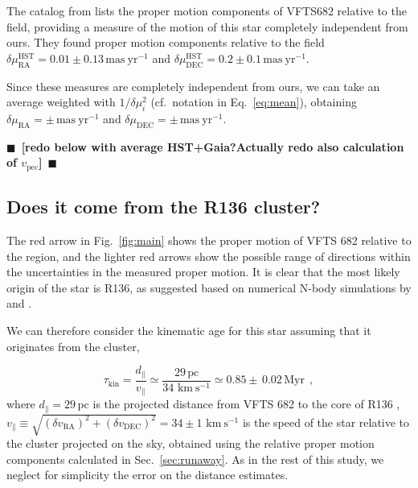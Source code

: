 \documentclass[apjl,twocolumn]{emulateapj}
\newcommand{\todo}[1]{{\large $\blacksquare$~\textbf{\color{red}[#1]}}~$\blacksquare$}
\newcommand{\kms}{{\,\mathrm{km\ s^{-1}}}}
\DeclareRobustCommand{\Eqref}[1]{Eq.~\ref{#1}}
\DeclareRobustCommand{\Figref}[1]{Fig.~\ref{#1}}
\DeclareRobustCommand{\Secref}[1]{Sec.~\ref{#1}}
\begin{document}
The catalog from \citet{platais:18} lists the proper motion
components of VFTS682 relative to the field, providing a
measure of the motion of this star completely independent from
ours. They found proper
motion components relative to the field
$\delta\mu_\mathrm{RA}^\mathrm{HST} = 0.01\pm0.13\,\mathrm{mas\
  yr^{-1}}$ and
$\delta\mu_\mathrm{DEC}^\mathrm{HST}=0.2\pm0.1\,\mathrm{mas\
  yr^{-1}}$.

Since these measures are completely independent from ours, we can take
an average weighted with $1/\delta \mu_i^2$ (cf.~notation in
\Eqref{eq:mean}), obtaining $\delta\mu_\mathrm{RA}=\pm\,\mathrm{mas\
  yr^{-1}}$ and $\delta\mu_\mathrm{DEC}=\pm\,\mathrm{mas\
  yr^{-1}}$.





\todo{redo below with average HST+Gaia?Actually redo also calculation
  of $v_\mathrm{pec}$}
\subsection{Does it come from the R136 cluster?}
\label{sec:r136_origin}

The red arrow in \Figref{fig:main} shows the proper motion of VFTS 682
relative to the region, and the lighter red arrows show the possible
range of directions within the uncertainties in the measured proper
motion. It is clear that the most likely origin of the star is R136,
as suggested based on numerical N-body simulations by \cite{fujii:11}
and \cite{banerjee:12}.

We can therefore consider the kinematic age for this star assuming
that it originates from the cluster,

\begin{equation}
  \label{eq:kin_age}
  \tau_\mathrm{kin} = \frac{d_\parallel}{v_\parallel} \simeq
  \frac{29\,\mathrm{pc}}{34\,\kms} \simeq 0.85\pm\,0.02\, \mathrm{Myr} \ \ ,
\end{equation}
where $d_\parallel =29$\,pc is the projected distance from VFTS 682 to
the core of R136 \citep[][]{bestenlehner:11}, $v_\parallel \equiv \sqrt{\left(\delta v_\mathrm{RA}\right)^2
    +\left(\delta v_\mathrm{DEC}\right)^2} =34\pm
1\,\kms$ is the speed of the star relative to the cluster projected on the sky, obtained
using the relative proper motion components calculated in
\Secref{sec:runaway}.%
As in the rest of this study, we neglect for
simplicity the error on the distance estimates.
\end{document}
